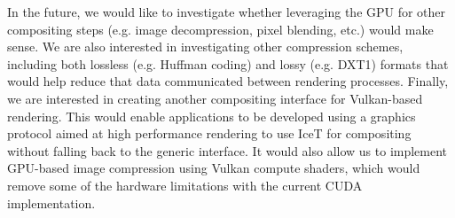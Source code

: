 \documentclass{vgtc}                          %
\begin{document}
In the future, we would like to investigate whether leveraging the GPU for other compositing steps (e.g. image decompression, pixel blending, etc.) would make sense. We are also interested in investigating other compression schemes, including both lossless (e.g. Huffman coding) and lossy (e.g. DXT1) formats that would help reduce that data communicated between rendering processes. Finally, we are interested in creating another compositing interface for Vulkan-based rendering. This would enable applications to be developed using a graphics protocol aimed at high performance rendering to use IceT for compositing without falling back to the generic interface. It would also allow us to implement GPU-based image compression using Vulkan compute shaders, which would remove some of the hardware limitations with the current CUDA implementation.
 





\end{document}
